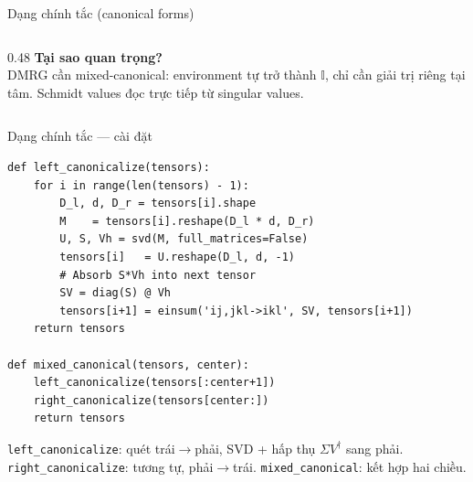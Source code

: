 \documentclass[aspectratio=169, 11pt]{beamer}
\begin{document}
\begin{frame}[fragile, shrink=5]{Dạng chính tắc (canonical forms)}
\begin{columns}[T]
\begin{column}{0.48\textwidth}
\vspace{4pt}
\textcolor{qamber}{\textbf{Tại sao quan trọng?}}\\[2pt]
{\small DMRG cần mixed-canonical: environment tự trở thành $\mathbb{I}$, chỉ cần giải trị riêng tại tâm. Schmidt values đọc trực tiếp từ singular values.}

\end{column}
\end{columns}

\end{frame}

\begin{frame}[fragile, shrink=3]{Dạng chính tắc --- cài đặt}

\begin{lstlisting}
def left_canonicalize(tensors):
    for i in range(len(tensors) - 1):
        D_l, d, D_r = tensors[i].shape
        M    = tensors[i].reshape(D_l * d, D_r)
        U, S, Vh = svd(M, full_matrices=False)
        tensors[i]   = U.reshape(D_l, d, -1)
        # Absorb S*Vh into next tensor
        SV = diag(S) @ Vh
        tensors[i+1] = einsum('ij,jkl->ikl', SV, tensors[i+1])
    return tensors

def mixed_canonical(tensors, center):
    left_canonicalize(tensors[:center+1])
    right_canonicalize(tensors[center:])
    return tensors
\end{lstlisting}

\vspace{4pt}
{\small \texttt{left\_canonicalize}: quét trái$\to$phải, SVD + hấp thụ $\Sigma V^\dagger$ sang phải.
\texttt{right\_canonicalize}: tương tự, phải$\to$trái. \texttt{mixed\_canonical}: kết hợp hai chiều.}

\end{frame}
\end{document}
